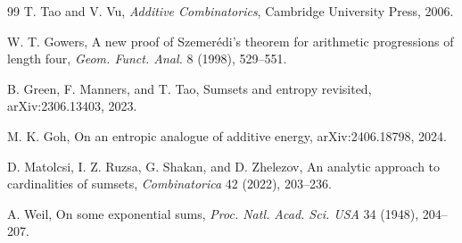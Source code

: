 \documentclass[11pt,a4paper]{amsart}
\numberwithin{equation}{section}
\theoremstyle{remark}
\begin{document}
\begin{thebibliography}{99}
T. Tao and V. Vu,
\newblock \emph{Additive Combinatorics},
\newblock Cambridge University Press, 2006.

W. T. Gowers,
\newblock A new proof of Szemer\'edi's theorem for arithmetic progressions of length four,
\newblock \emph{Geom. Funct. Anal.} 8 (1998), 529--551.

B. Green, F. Manners, and T. Tao,
\newblock Sumsets and entropy revisited,
\newblock arXiv:2306.13403, 2023.

M. K. Goh,
\newblock On an entropic analogue of additive energy,
\newblock arXiv:2406.18798, 2024.

D. Matolcsi, I. Z. Ruzsa, G. Shakan, and D. Zhelezov,
\newblock An analytic approach to cardinalities of sumsets,
\newblock \emph{Combinatorica} 42 (2022), 203--236.

A. Weil,
\newblock On some exponential sums,
\newblock \emph{Proc. Natl. Acad. Sci. USA} 34 (1948), 204--207.
\end{thebibliography}
\end{document}

